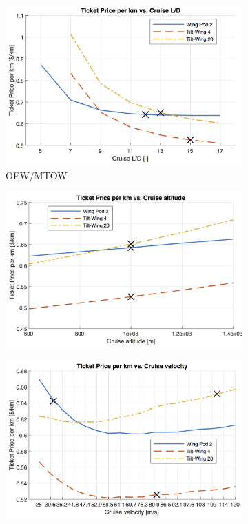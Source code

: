 \begin{figure}[H]
\begin{subfigure}[t]{0.33\textwidth}
    \centering
    \includegraphics[width=\textwidth]{Figures/LoD_TPrice_perkmNOPAD.png}
    \captionsetup{width=.8\linewidth}
    \caption{OEW/MTOW}
    \label{fig:sens4}
\end{subfigure}
\begin{subfigure}[t]{0.33\textwidth}
    \centering
    \includegraphics[width=\textwidth]{Figures/Alt_TPrice_perkmNOPAD.png}
    \captionsetup{width=.8\linewidth}
    \caption{}
    \label{fig:sens5}
\end{subfigure}
\begin{subfigure}[t]{0.33\textwidth}
    \centering
    \includegraphics[width=\textwidth]{Figures/Cruise_TPrice_perkmNOPAD.png}

\end{subfigure}
\end{figure}
